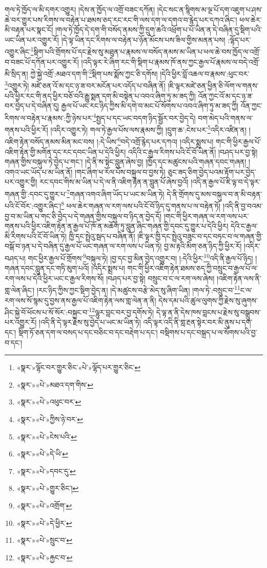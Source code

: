 གལ་ཏེ་ཁྱོད་ལ་མི་དགར་འགྱུར། །དེས་ན་ཁྱོད་ལ་འགྲོ་བཟང་དཀོན། །དེང་སང་ན་སྙིགས་མ་ལྔ་པོ་དག་འཇུག་པ་ཤས་ཆེ་བར་གྱུར་པས་རིགས་ལ་བརྟེན་པ་ཐམས་ཅད་རང་རང་གི་ལས་དག་ལ་དགའ་བ་རྙེད་པར་དཀའ་ཞིང་། ཕལ་ཆེར་མི་བརྟན་པར་སྣང་ངོ། །གལ་ཏེ་ཁྱོད་དེ་དག་གི་བསོད་ནམས་ཀྱི་དྲུག་ཆའི་འཕྲོག་པ་པོ་ཡིན་ན་དེ་བཞིན་དུ་སྡིག་པའི་ཡང་ཡིན་པར་འགྱུར་རོ། །དེ་ལྟ་ཡིན་དང་རིགས་ལ་བརྟེན་པ་ཉོན་མོངས་པས་ཟིལ་གྱིས་མནན་པས། :ལྷོད་པར་འགྱུར་ཞིང་\footnote{«སྣར་»ལྷོང་བར་གྱུར་ཅིང་«པེ་»ལྷོད་པར་གྱུར་ཅིང་}སྡིག་པའི་གྲོགས་པོ་དང་རྗེས་སུ་མཐུན་པ་རྣམས་ལ་བསོད་ནམས་མ་ཡིན་པ་ཕལ་ཆེ་བས་ཁྱོད་ལ་འགྲོ་བ་བཟང་པོ་དཀོན་པར་འགྱུར་རོ། །འདི་ལྟར་རེ་ཞིག་རང་གི་སྡིག་པ་རྣམས་ཁོ་ནས་ཀྱང་རྒྱལ་པོ་རྣམས་ལ་བདེ་འགྲོ་མི་སྲིད་ན། ཀྱེ་སྐྱེ་འགྲོ་:མཐའ་དག་གི་\footnote{«སྣར་»«པེ་»མཐའ་དག་གིས་}སྡིག་པས་སྨོས་ཀྱང་ཅི་དགོས། །དེའི་ཕྱིར་བློ་འཆལ་བ་རྣམས་:ཕུང་བར་\footnote{«སྣར་»«པེ་»འཕུང་བར་}འགྱུར་ཏེ། མཛེ་ཅན་འོ་མ་དང་ཉ་ཟ་བར་མངོན་པར་འདོད་པ་བཞིན་ནོ། །ཇི་ལྟར་མཛེ་ཅན་ཕྱིན་ཅི་ལོག་ལ་གནས་པའི་ཕྱིར་རང་གི་ནད་ཕྱིར་བཅོ་བའི་རྒྱུ་སྨན་དག་མི་བསྟེན་པ་འབའ་ཞིག་ཏུ་མ་ཟད་ཀྱི། འོན་ཀྱང་འོ་མ་དང་ཉ་ཟ་བར་བྱེད་པ་དེ་བཞིན་དུ། རྒྱལ་པོ་ཡང་རང་ཉིད་ཀྱིས་མི་དགེ་བ་མང་པོ་སོགས་པ་འབའ་ཞིག་ཏུ་མ་ཟད་ཀྱི། འོན་ཀྱང་རིགས་ལ་བརྟེན་པ་རྣམས་:ཀྱི་ཉེས་པར་\footnote{«སྣར་»«པེ་»ཀྱིས་ཉེ་བར་}སྤྱད་པ་དང་ཡང་བདག་ཉིད་སྦྱོར་བར་བྱེད་དེ། བག་མེད་པའི་གནས་ལ་གནས་པའི་ཕྱིར་རོ། །འདིར་འགྱུར་ཏེ། གལ་ཏེ་རྒྱལ་པོས་ལས་རྣམས་ཀྱི། །དྲུག་ཆ་:ངེས་པར་\footnote{«སྣར་»«པེ་»ངེས་པའི་}འདིར་འཛིན་ན། །འཇིག་རྟེན་བསོད་ནམས་མིན་མང་བས། །:དེ་ཡིས་\footnote{«སྣར་»«པེ་»དེ་ཡི་}བདེ་འགྲོ་རྙེད་པར་དཀའ། །འདིར་སྨྲས་པ། གང་གི་ཕྱིར་རྒྱལ་པོ་འཇིག་རྟེན་གྱི་མགོན་དང་རང་དབང་ཡིན་པ་དེའི་ཕྱིར། འདིའི་ང་རྒྱལ་རིགས་པའི་ངོ་བོ་ཡིན་ནོ། །བཤད་པར་བྱ་སྟེ། གཞན་གྱིས་བསྐུལ་ཏེ་བྱེད་པ་གང་། །དེ་ནི་ས་སྟེང་བླུན་ཞེས་བྱ། །ཁྱོད་དང་མཚུངས་པའི་གཞན་དབང་གཞན། །འགའ་ཡང་ཡོད་པ་མ་ཡིན་ནོ། །གང་ཞིག་ཕ་རོལ་པོས་བསྐུལ་བ་བྱས་ཏེ། ཅུང་ཟད་ཅིག་བྱེད་པའམ་རྟོག་པར་བྱེད་པར་འགྱུར་གྱི། རང་དབང་གིས་མ་ཡིན་པ་དེ་ལ་ནི་འཇིག་རྟེན་ན་བླུན་པོ་ཞེས་བྱའོ། །འདི་ན་རྒྱལ་པོ་ཇི་ལྟ་བ་དེ་ལྟར་གཞན་གྱི་:དབང་དུ་གྱུར་པ་\footnote{«སྣར་»«པེ་»དབང་དུ་}གཞན་འགའ་ཞིག་ཡོད་པ་ཡང་མ་ཡིན་ཏེ། དེ་ནི་གྲོགས་དུ་མས་བསྐུལ་བ་ན་མི་བརྟན་པའི་ངོ་བོར་:འགྱུར་ཞིང་།\footnote{«སྣར་»«པེ་»གྱུར་ཅིང་།} ཕལ་ཆེར་གཞན་ལ་རག་ལས་པའི་ངོ་བོ་ཉིད་དུ་གནས་པ་ལ་བརྟེན་ཏོ། །འདི་ནི་བྱ་བའམ་བྱ་བ་མ་ཡིན་པ་གང་ཅི་བྱེད་པ་དེ་གཞན་གྱིས་བསྐུལ་བ་ཉིད་ན་བྱེད་དོ། །གང་གི་ཕྱིར་གཞན་ལ་རག་ལས་པར་གནས་པའི་ཕྱིར་འཇིག་རྟེན་ན་རྒྱལ་པོ་ཁོ་ན་མཆོག་ཏུ་བླུན་ཞིང་གཞན་གྱི་དབང་དུ་གྱུར་པ་དེའི་ཕྱིར། དེའི་ང་རྒྱལ་མི་རིགས་པའི་ངོ་བོ་ཡིན་ཏེ། ཁྱི་དང་སྤྲེའུ་སྦད་པ་བཞིན་ནོ། །ཇི་ལྟར་ཁྱི་དང་སྤྲེའུ་བཟུང་བ་དང་བཏང་བ་ལ་གཞན་གྱི་བསྒོ་བ་ཉན་པ་དེ་བཞིན་དུ་རྒྱལ་པོ་ཡང་གཞན་ལ་རག་ལས་པ་ཡིན་ཏེ། བྱ་མ་རྟའི་མིག་ཅན་ཉིད་ཀྱི་ཕྱིར་རོ། །འདིར་བཤད་པ། གང་ཕྱིར་རྒྱལ་པོ་གྲོགས་\footnote{«སྣར་»«པེ་»འགྲོག་}བསྐུལ་ཏེ། །བྱ་དང་བྱ་མིན་བྱེད་འགྱུར་བ། །:དེའི་ཕྱིར་\footnote{«སྣར་»«པེ་»དེ་ཕྱིར་}འདི་ནི་རྒྱལ་པོ་ཉིད། །གཞན་དབང་བླུན་དང་གཏི་མུག་པའོ། །འདིར་སྨྲས་པ། གང་གི་ཕྱིར་འཇིག་རྟེན་ཐམས་ཅད་ཀྱི་བསྲུང་བ་རྒྱལ་པོ་ལ་རག་ལས་པ་དེའི་ཕྱིར་ཡང་ང་རྒྱལ་རིགས་སོ། །བཤད་པར་བྱ་སྟེ། བསྲུང་བ་ང་ལ་རག་ལས་ཞེས། །འཇིག་རྟེན་ལས་ནི་གླ་ལེན་ཞིང་། །རང་ཉིད་ཀྱིས་ཀྱང་སྡིག་བྱེད་ན། །དེ་མཚུངས་བརྩེ་མེད་སུ་ཞིག་ཡིན། །གལ་ཏེ་:བསྲུང་བ་\footnote{«སྣར་»«པེ་»སྲུང་བ་}ང་ལ་རག་ལས་སོ་སྙམ་དུ་བྱས་ནས་རྒྱལ་པོ་འཇིག་རྟེན་ལས་གླ་ལེན་ན་ནི། དེས་དམ་པའི་ཚུལ་ལུགས་ཀྱི་རྗེས་སུ་ཞུགས་ཤིང་སྐྱེ་བོ་ཕོངས་པ་སོ་སོར་:བསྐྱང་བ་\footnote{«སྣར་»«པེ་»རྐྱང་བ་}ལྷུར་བླང་བར་བྱ་དགོས་ཏེ། དེ་ལྟ་ན་ནི་དེས་ཁས་བླངས་པ་རྗེས་སུ་བསྒྲུབས་པར་འགྱུར་རོ། །འདི་ནི་དེ་ལྟར་རྗེས་སུ་བྱེད་པ་ཡང་མ་ཡིན་ཏེ། འདི་ལྟར་འདི་ནི་གླ་རྔན་སྟེར་བར་མི་ནུས་པ་དག་དང་། སྡིག་ཏོ་ཅན་དག་ལ་བསད་པ་དང་བཅིང་བ་དང་བརྡེག་པ་དང་། བསྡིགས་པ་དང་བསྐྲད་པ་ལ་སོགས་པའི་བྱ་བ་དང་། 